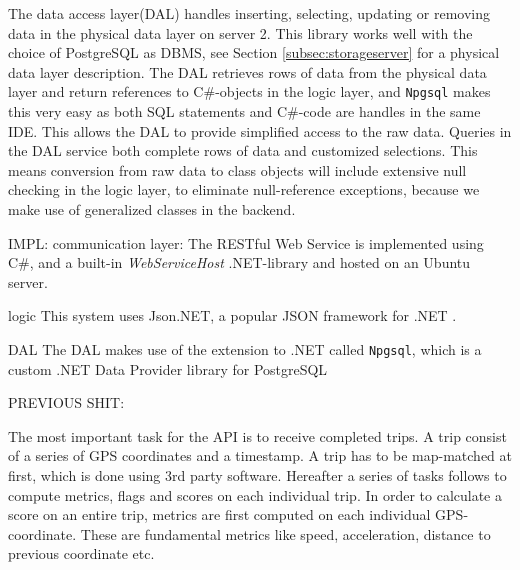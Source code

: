 The data access layer(DAL) handles inserting, selecting, updating or removing data in the physical data layer on server 2. This library works well with the choice of PostgreSQL as DBMS, see Section \ref{subsec:storageserver} for a physical data layer description. The DAL retrieves rows of data from the physical data layer and return references to C\#-objects in the logic layer, and \texttt{Npgsql} makes this very easy as both SQL statements and C\#-code are handles in the same IDE. This allows the DAL to provide simplified access to the raw data. Queries in the DAL service both complete rows of data and customized selections. This means conversion from raw data to class objects will include extensive null checking in the logic layer, to eliminate null-reference exceptions, because we make use of generalized classes in the backend. 






IMPL:
communication layer:
The RESTful Web Service is implemented using C\#, and a built-in \textit{WebServiceHost} .NET-library and hosted on an Ubuntu server.


logic
This system uses Json.NET, a popular JSON framework for .NET \citep{json_dot_net}. 

DAL
The DAL makes use of the extension to .NET called \texttt{Npgsql}\citep{npgsql}, which is a custom .NET Data Provider library for PostgreSQL


PREVIOUS SHIT:

The most important task for the API is to receive completed trips. A trip consist of a series of GPS coordinates and a timestamp. A trip has to be map-matched at first, which is done using 3rd party software\cite{trackmatch}. Hereafter a series of tasks follows to compute metrics, flags and scores on each individual trip\cite{sw9_report}. In order to calculate a score on an entire trip, metrics are first computed on each individual GPS-coordinate. These are fundamental metrics like speed, acceleration, distance to previous coordinate etc. 

